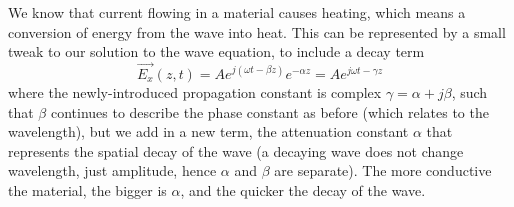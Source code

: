\documentclass{tufte-handout}
\begin{document}
We know that current flowing in a material causes heating, which means a conversion of energy from the wave into heat. This can be represented by a small tweak to our solution to the wave equation, to include a decay term
\begin{equation}
\vec{E_x}(z,t) = Ae^{j\left(\omega{}t-\beta{}z\right)}e^{-\alpha{}z} = Ae^{j\omega{}t-\gamma{}z}\label{eq:lossysolution}
\end{equation} 
where the newly-introduced propagation constant is complex $\gamma = \alpha + j\beta$, such that $\beta$ continues to describe the phase constant as before (which relates to the wavelength), but we add in a new term, the attenuation constant $\alpha$ that represents the spatial decay of the wave (a decaying wave does not change wavelength, just amplitude, hence $\alpha$ and $\beta$ are separate). The more conductive the material, the bigger is $\alpha$, and the quicker the decay of the wave. 
\end{document}

